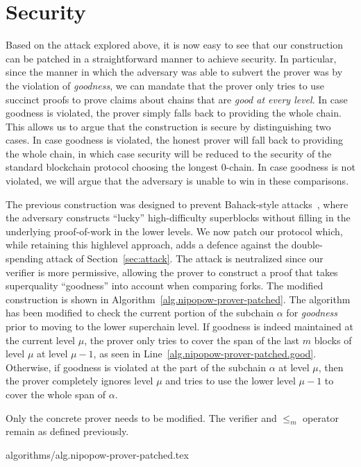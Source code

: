 \section{Security}

Based on the attack explored above, it is now easy to see that our construction
can be patched in a straightforward manner to achieve security. In particular,
since the manner in which the adversary was able to subvert the prover was by
the violation of \emph{goodness}, we can mandate that the prover only tries to
use succinct proofs to prove claims about chains that are
\emph{good at every level}. In case goodness is violated, the prover simply
falls back to providing the whole chain. This allows us to argue that the
construction is secure by distinguishing two cases. In case goodness is
violated, the honest prover will fall back to providing the whole chain, in
which case security will be reduced to the security of the standard
blockchain protocol choosing the longest $0$-chain. In case goodness is not
violated, we will argue that the adversary is unable to win in these
comparisons.

The previous construction was designed to prevent Bahack-style
attacks~\cite{bahack}, where the adversary constructs ``lucky'' high-difficulty
superblocks without filling in the underlying proof-of-work in the lower levels.
We now patch our protocol which, while retaining this highlevel approach, adds a
defence against the double-spending attack of Section~\ref{sec:attack}. The
attack is neutralized since our verifier is more permissive, allowing the prover
to construct a proof that takes superquality ``goodness'' into account when
comparing forks. The modified construction is shown in
Algorithm~\ref{alg.nipopow-prover-patched}. The algorithm has been modified to
check the current portion of the subchain $\alpha$ for \emph{goodness} prior to
moving to the lower superchain level. If goodness is indeed maintained at the
current level $\mu$, the prover only tries to cover the span of the last $m$
blocks of level $\mu$ at level $\mu - 1$, as seen in
Line~\ref{alg.nipopow-prover-patched.good}. Otherwise, if goodness is violated
at the part of the subchain $\alpha$ at level $\mu$, then the prover completely
ignores level $\mu$ and tries to use the lower level $\mu - 1$ to cover the
whole span of $\alpha$.

Only the concrete prover needs to be modified. The verifier and $\leq_m$
operator remain as defined previously.

{algorithms/alg.nipopow-prover-patched.tex}

